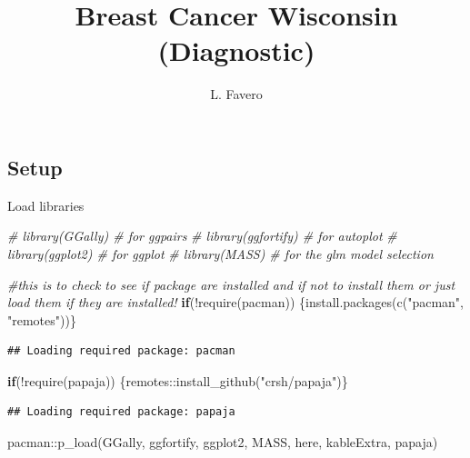 \documentclass[
  11pt,
]{article}
\title{Breast Cancer Wisconsin (Diagnostic)}
\author{L. Favero}
\date{}
\newenvironment{Shaded}{\begin{snugshade}}{\end{snugshade}}
\newcommand{\CommentTok}[1]{\textcolor[rgb]{0.56,0.35,0.01}{\textit{#1}}}
\newcommand{\ControlFlowTok}[1]{\textcolor[rgb]{0.13,0.29,0.53}{\textbf{#1}}}
\newcommand{\FunctionTok}[1]{\textcolor[rgb]{0.00,0.00,0.00}{#1}}
\newcommand{\NormalTok}[1]{#1}
\newcommand{\SpecialCharTok}[1]{\textcolor[rgb]{0.00,0.00,0.00}{#1}}
\newcommand{\StringTok}[1]{\textcolor[rgb]{0.31,0.60,0.02}{#1}}
\begin{document}
\maketitle

{
\hypersetup{linkcolor=}
\setcounter{tocdepth}{1}
\tableofcontents
}
\hypertarget{setup}{%
\subsection{Setup}\label{setup}}

Load libraries

\begin{Shaded}
\begin{Highlighting}[]
\CommentTok{\# library(GGally)       \# for ggpairs}
\CommentTok{\# library(ggfortify)    \# for autoplot}
\CommentTok{\# library(ggplot2)      \# for ggplot}
\CommentTok{\# library(\textquotesingle{}MASS\textquotesingle{})       \# for the glm model selection }

\CommentTok{\#this is to check to see if package are installed and if not to install them or just load them if they are installed!}
\ControlFlowTok{if}\NormalTok{(}\SpecialCharTok{!}\FunctionTok{require}\NormalTok{(pacman)) \{}\FunctionTok{install.packages}\NormalTok{(}\FunctionTok{c}\NormalTok{(}\StringTok{"pacman"}\NormalTok{, }\StringTok{"remotes"}\NormalTok{))\}}
\end{Highlighting}
\end{Shaded}

\begin{verbatim}
## Loading required package: pacman
\end{verbatim}

\begin{Shaded}
\begin{Highlighting}[]
\ControlFlowTok{if}\NormalTok{(}\SpecialCharTok{!}\FunctionTok{require}\NormalTok{(papaja)) \{remotes}\SpecialCharTok{::}\FunctionTok{install\_github}\NormalTok{(}\StringTok{"crsh/papaja"}\NormalTok{)\}}
\end{Highlighting}
\end{Shaded}

\begin{verbatim}
## Loading required package: papaja
\end{verbatim}

\begin{Shaded}
\begin{Highlighting}[]
\NormalTok{pacman}\SpecialCharTok{::}\FunctionTok{p\_load}\NormalTok{(GGally, ggfortify, ggplot2, MASS, here, kableExtra, papaja)}
\end{Highlighting}
\end{Shaded}
\end{document}
